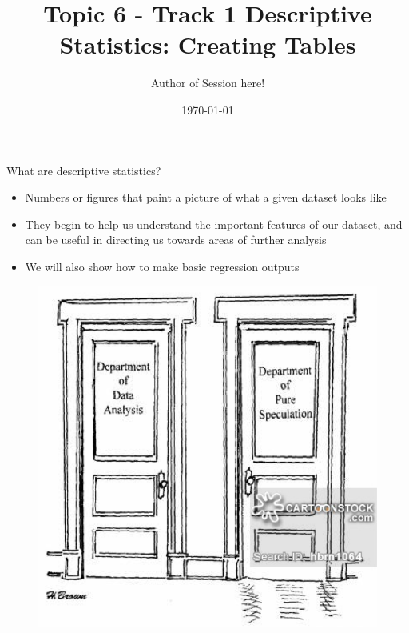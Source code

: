 \documentclass[aspectratio=169]{beamer}
\title{Topic 6 - Track 1 \newline Descriptive Statistics: \newline Creating Tables}
\date{\today}
\author{Author of Session here!} %
\institute{Development Impact Evaluation (DIME) \newline The World Bank }
\begin{document}
	
	{
		\maketitle
	}

\begin{frame}[fragile]{What are descriptive statistics?}
\begin{multicols}{2}	
	\begin{itemize}
		\item Numbers or figures that paint a picture of what a given dataset looks like
		\item They begin to help us understand the important features of our dataset, and can be useful in directing us towards areas of further analysis
		\item We will also show how to make basic regression outputs
	\end{itemize}
	\begin{figure}
		\centering
		\includegraphics[width=\linewidth]{img/descriptivecartoon}
	\end{figure}
\end{multicols}
\end{frame}
\end{document}
